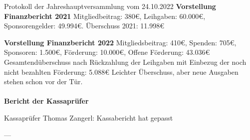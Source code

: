 \documentclass{scrartcl}
\newcommand\obmann{Philipp Machac}
\begin{document}
\begin{Minutes}{Protokoll der Jahreshauptversammlung vom 24.10.2022}
  \textbf{Vorstellung Finanzbericht 2021}
  Mitgliedbeitrag: 380€, Leihgaben: 60.000€, Sponsorengelder: 49.994€.
  Überschuss 2021: 11.998€

  \textbf{Vorstellung Finanzbericht 2022}
  Mitgliedsbeitrag: 410€, Spenden: 705€, Sponsoren: 1.500€, Förderung: 10.000€, Offene Förderung: 43.036€\\

  Gesamtendüberschuss nach Rückzahlung der Leihgaben mit Einbezug der noch nicht bezahlten Förderung: 5.088€
  Leichter Überschuss, aber neue Ausgaben stehen schon vor der Tür.\\\\
  \textbf{Bericht der Kassaprüfer}

  Kassaprüfer Thomas Zangerl: \glqq Kassabericht hat gepasst\grqq{}



  ---
  \vspace{0.2\textheight}

  \signature{Obmann, \obmann}
  \hspace{0.2\columnwidth}
  \signature{Schriftführer, Simon Abler}
\end{Minutes}

\end{document}
